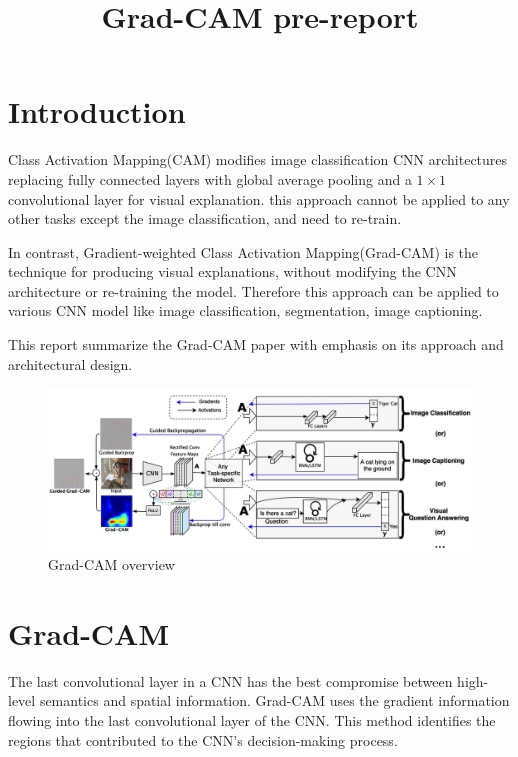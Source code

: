 \documentclass[extendedabs]{bmvc2k}
\begin{document}
\title{Grad-CAM pre-report}

 

\maketitle
\noindent

\section{Introduction}
Class Activation Mapping(CAM)\cite{cam} modifies image classification CNN architectures replacing fully connected layers with global average pooling and a $1\times1$ convolutional layer for visual explanation. this approach cannot be applied to any other tasks except the image classification, and need to re-train. 
 
In contrast, Gradient-weighted Class Activation Mapping(Grad-CAM)\cite{gradcam} is the technique for producing visual explanations, without modifying the CNN architecture or re-training the model. Therefore this approach can be applied to various CNN model like image classification, segmentation, image captioning.

This report summarize the Grad-CAM paper\cite{gradcam} with emphasis on its approach and architectural design.

\begin{figure}[t]
\centering
	\includegraphics[width=\linewidth]{images/fig1.PNG}
	\caption{
		Grad-CAM overview}
	\vspace{-2mm}
        \label{fig:gradcamoverview}
\end{figure}

\section{Grad-CAM}
The last convolutional layer in a CNN has the best compromise between high-level semantics and spatial information. Grad-CAM uses the gradient information flowing into the last convolutional layer of the CNN. 
This method identifies the regions that contributed to the CNN's decision-making process.
\end{document}
